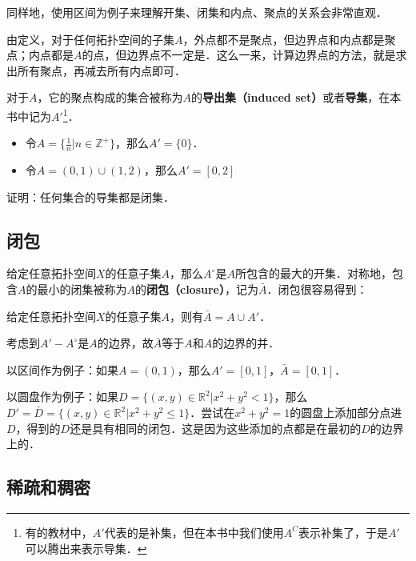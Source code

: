 同样地，使用区间为例子来理解开集、闭集和内点、聚点的关系会非常直观．

由定义，对于任何拓扑空间的子集$A$，外点都不是聚点，但边界点和内点都是聚点；内点都是$A$的点，但边界点不一定是．这么一来，计算边界点的方法，就是求出所有聚点，再减去所有内点即可．

对于$A$，它的聚点构成的集合被称为$A$的\textbf{导出集（induced set）}或者\textbf{导集}，在本书中记为$A'$\footnote{有的教材中，$A'$代表的是补集，但在本书中我们使用$A^C$表示补集了，于是$A'$可以腾出来表示导集．}．

\begin{example}{}
\begin{itemize}
\item 令$A=\{\frac{1}{n}|n\in\mathbb{Z}^+\}$，那么$A'=\{0\}$．
\item 令$A=(0,1)\cup(1,2)$，那么$A'=[0,2]$
\end{itemize}
\end{example}

\begin{exercise}{}
证明：任何集合的导集都是闭集．
\end{exercise}

\subsection{闭包}

给定任意拓扑空间$X$的任意子集$A$，那么$A^\circ$是$A$所包含的最大的开集．对称地，包含$A$的最小的闭集被称为$A$的\textbf{闭包（closure）}，记为$\bar{A}$．闭包很容易得到：

\begin{theorem}{}
给定任意拓扑空间$X$的任意子集$A$，则有$\bar{A}=A\cup A'$．
\end{theorem}
\begin{corollary}{}
考虑到$A'-A^\circ$是$A$的边界，故$\bar{A}$等于$A$和$A$的边界的并．
\end{corollary}

以区间作为例子：如果$A=(0,1)$，那么$A'=[0,1]$，$\bar{A}=[0,1]$．

以圆盘作为例子：如果$D=\{(x,y)\in\mathbb{R}^2|x^2+y^2<1\}$，那么$D'=\bar{D}=\{(x,y)\in\mathbb{R}^2|x^2+y^2\leq1\}$．尝试在$x^2+y^2=1$的圆盘上添加部分点进$D$，得到的$D$还是具有相同的闭包．这是因为这些添加的点都是在最初的$D$的边界上的．

\subsection{稀疏和稠密}